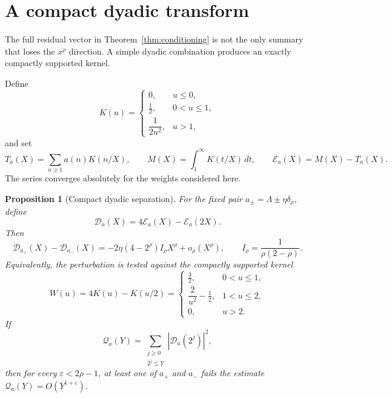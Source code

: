 \documentclass[11pt,a4paper]{amsart}
\newtheorem{proposition}[theorem]{Proposition}
\theoremstyle{definition}
\newcommand{\1}{\mathbf 1}
\begin{document}
\section{A compact dyadic transform}\label{sec:compact}

The full residual vector in Theorem~\ref{thm:conditioning} is not the only summary that loses the $x^\rho$ direction.  A simple dyadic combination produces an exactly compactly supported kernel.

Define
\begin{equation}\label{eq:K}
 K(u)=
 \begin{cases}
 0,&u\le0,\\
 \tfrac12,&0<u\le1,\\
 \dfrac{1}{2u^2},&u>1,
 \end{cases}
\end{equation}
and set
\begin{equation}\label{eq:transform}
 T_a(X)=\sum_{n\ge1}a(n)K(n/X),
 \qquad
 M(X)=\int_1^\infty K(t/X)\,dt,
 \qquad
 \mathcal E_a(X)=M(X)-T_a(X).
\end{equation}
The series converges absolutely for the weights considered here.

\begin{proposition}[Compact dyadic separation]\label{prop:compact}
For the fixed pair $a_\pm=\Lambda\pm\eta\delta_\rho$, define
\[
 \mathcal D_a(X)=4\mathcal E_a(X)-\mathcal E_a(2X).
\]
Then
\begin{equation}\label{eq:compact-separation}
 \mathcal D_{a_+}(X)-\mathcal D_{a_-}(X)
 =-2\eta(4-2^\rho)I_\rho X^\rho+o_\rho(X^\rho),
 \qquad
 I_\rho=\frac1{\rho(2-\rho)}.
\end{equation}
Equivalently, the perturbation is tested against the compactly supported kernel
\begin{equation}\label{eq:W}
 W(u)=4K(u)-K(u/2)=
 \begin{cases}
 \tfrac32,&0<u\le1,\\
 \dfrac{2}{u^2}-\tfrac12,&1<u\le2,\\
 0,&u>2.
 \end{cases}
\end{equation}
If
\[
 \mathcal Q_a(Y)=\sum_{\substack{j\ge0\\2^j\le Y}}
 |\mathcal D_a(2^j)|^2,
\]
then for every $\varepsilon<2\rho-1$, at least one of $a_+$ and $a_-$ fails the estimate
$\mathcal Q_a(Y)=O(Y^{1+\varepsilon})$.
\end{proposition}
\end{document}

